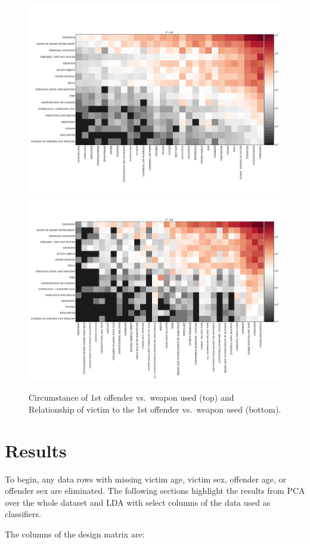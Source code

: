 \documentclass{evanarticle}
\begin{document}
\begin{figure}
  \centering
    \includegraphics[width=0.8\linewidth]{images/all_data_relation.pdf}
    \includegraphics[width=0.8\linewidth]{images/all_data_circum.pdf}
  \caption{Circumstance of 1st offender vs.~weapon used (top) and Relationship of victim to the 1st offender vs.~weapon used (bottom).}
\end{figure}

\section{Results}

To begin, any data rows with missing victim age, victim sex, offender age, or offender sex are eliminated.  The following sections highlight the results from PCA over the whole dataset and LDA with select columns of the data used as classifiers.

The columns of the design matrix are:
\end{document}
